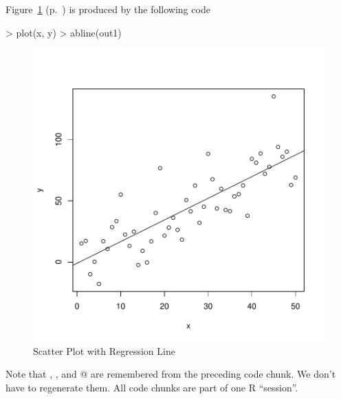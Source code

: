 \documentclass{article}
\begin{document}
Figure~\ref{fig:one} (p.~\pageref{fig:one})
is produced by the following code
\begin{Schunk}
\begin{Sinput}
> plot(x, y)
> abline(out1)
\end{Sinput}
\end{Schunk}
\begin{figure}
\begin{center}
\includegraphics{sweve-fig1}
\end{center}
\caption{Scatter Plot with Regression Line}
\label{fig:one}
\end{figure}
Note that \verb@x@, \verb@y@, and @ are remembered from
the preceding code chunk.  We don't have to regenerate them.
All code chunks are part of one R ``session''.
\end{document}
